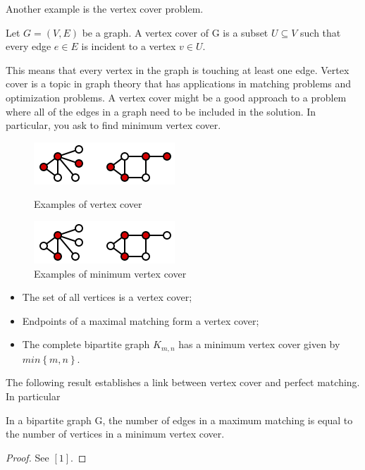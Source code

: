 Another example is the vertex cover problem.
\begin{definition}
Let $G = (V,E)$ be a graph. A vertex cover of G is a subset $U \subseteq V$ such that every edge $e \in E$ is incident to a vertex $v \in U$.
\end{definition}
This means that every vertex in the graph is touching at least one edge. Vertex cover is a topic in graph theory that has applications in matching problems and optimization problems. A vertex cover might be a good approach to a problem where all of the edges in a graph need to be included in the solution. In particular, you ask to find minimum vertex cover. 

\begin{figure}[htbp]
\begin{minipage}[htbp]{.80\textwidth}
\centering
\includegraphics[width=.60\textwidth]{cover.png}
\caption{Examples of vertex cover}
\end{minipage}
\begin{minipage}[htbp]{.80\textwidth}
\centering
\includegraphics[width=.60\textwidth]{cover1.png}
\caption{Examples of minimum vertex cover}
\end{minipage}
\end{figure}

\begin{observation}
\begin{itemize}
We just report some properties of Vertex Cover:
\item The set of all vertices is a vertex cover;
\item Endpoints of a maximal matching form a vertex cover;
\item The complete bipartite graph $K_{m,n}$ has a minimum vertex cover given by $min\left \{m,n \right \}$.
\end{itemize}
\end{observation}

The following result establishes a link between vertex cover and perfect matching. In particular
\begin{theorem}[K\"onig, 1931]
In a bipartite graph G, the number of edges in a maximum matching is equal to the number of vertices in a minimum vertex cover.
\end{theorem}
\begin{proof}
See $[1]$.
\end{proof}

